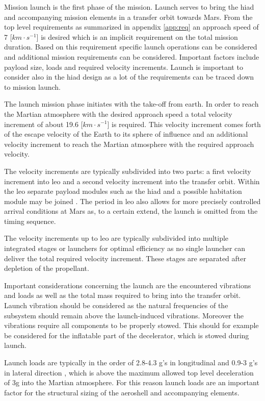 Mission launch is the first phase of the mission. Launch serves to bring the \gls{hiad} and accompanying mission elements in a transfer orbit towards Mars. From the top level requirements as summarized in appendix \ref{app:req} an approach speed of 7 [$km\cdot s^{-1}$] is desired which is an implicit requirement on the total mission duration.
Based on this requirement specific launch operations can be considered and additional mission requirements can be considered. Important factors include payload size, loads and required velocity increments. Launch is important to consider also in the \gls{hiad} design as a lot of the requirements can be traced down to mission launch.

The launch mission phase initiates with the take-off from earth. In order to reach the Martian atmosphere with the desired approach speed a total velocity increment of about 19.6 [$km\cdot s^{-1}$] is required. This velocity increment comes forth of the escape velocity of the Earth to its sphere of influence and an additional velocity increment to reach the Martian atmosphere with the required approach velocity.

The velocity increments are typically subdivided into two parts: a first velocity increment into \gls{leo} and a second velocity increment into the transfer orbit. Within the \gls{leo} separate payload modules such as the \gls{hiad} and a possible habitation module may be joined \cite{George2009}. The period in \gls{leo} also allows for more precisely controlled arrival conditions at Mars as, to a certain extend, the launch is omitted from the timing sequence. 

The velocity increments up to \gls{leo} are typically subdivided into multiple integrated stages or launchers for optimal efficiency as no single launcher can deliver the total required velocity increment. These stages are separated after depletion of the propellant.

Important considerations concerning the launch are the encountered vibrations and loads as well as the total mass required to bring into the transfer orbit. Launch vibration should be considered as the natural frequencies of the subsystem should remain above the launch-induced vibrations. Moreover the vibrations require all components to be properly stowed. This should for example be considered for the inflatable part of the decelerator, which is stowed during launch.

Launch loads are typically in the order of 2.8-4.3 g's in longitudinal and 0.9-3 g's in lateral direction \cite{Wertz2011}, which is above the maximum allowed top level deceleration of 3g into the Martian atmosphere. For this reason launch loads are an important factor for the structural sizing of the aeroshell and accompanying elements. 

